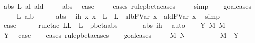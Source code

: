 \begin{isabellebody}
\isanewline
{}\isamarkupfalse%
\ {\isacharparenleft}abs\ L\ al\ ald{\isacharparenright}\ \isanewline
\ \ \isamarkupfalse%
\ abs{\isacharparenleft}{}{\isacharparenright}\ \isamarkupfalse%
\ {\isacharquery}case\ \isanewline
\ \ \isamarkupfalse%
\ {\isacharparenleft}cases\ rule{\isacharcolon}pbeta{\isachardot}cases{\isacharparenright}\ \isanewline
\ \ \isamarkupfalse%
\ simp\isanewline
\ \ \isamarkupfalse%
\ goal{\isacharunderscore}cases\isanewline
\ \ \isamarkupfalse%
\ {\isacharparenleft}{}\ L{\isacharprime}\ alb{\isacharparenright}\isanewline
\ \ \ \ \isamarkupfalse%
\ abs\ \isamarkupfalse%
\ ih{\isacharcolon}\ {\isachardoublequoteopen}{\isasymAnd}x{\isachardot}\ x\ {\isasymnotin}\ L\ {\isasymunion}\ L{\isacharprime}\ {\isasymLongrightarrow}\ alb{\isacharcircum}FVar\ x\ {\isasymggreater}\ ald{\isacharcircum}FVar\ x{\isachardoublequoteclose}\ \isamarkupfalse%
\ simp\isanewline
\ \ \ \ \isamarkupfalse%
\ {\isacharquery}case\isanewline
\ \ \ \ \isamarkupfalse%
\ {\isacharparenleft}rule{\isacharunderscore}tac\ L{\isacharequal}{\isachardoublequoteopen}L\ {\isasymunion}\ L{\isacharprime}{\isachardoublequoteclose}\ \ pbeta{\isachardot}abs{\isacharparenright}\isanewline
\ \ \ \ \isamarkupfalse%
\ {}\ abs\ ih\ \isamarkupfalse%
\ auto\isanewline
\ \ \isamarkupfalse%
\isanewline
{}\isamarkupfalse%
\isanewline
{}\isamarkupfalse%
\ {\isacharparenleft}Y\ M\ M{\isacharprime}\ {\isasymsigma}{\isacharparenright}\ \isanewline
\ \ \isamarkupfalse%
\ Y{\isacharparenleft}{}{\isacharparenright}\ \isamarkupfalse%
\ {\isacharquery}case\isanewline
\ \ \isamarkupfalse%
\ {\isacharparenleft}cases\ rule{\isacharcolon}pbeta{\isachardot}cases{\isacharparenright}\isanewline
\ \ \isamarkupfalse%
\ goal{\isacharunderscore}cases\isanewline
\ \ \isamarkupfalse%
\ {\isacharparenleft}{}\ M{\isacharprime}{\isacharprime}\ N{\isacharprime}{\isacharprime}{\isacharparenright}\isanewline
\ \ \ \ \isamarkupfalse%
\ {}{\isacharparenleft}{}{\isacharparenright}\ \isamarkupfalse%
\ {}{\isacharcolon}\ {\isachardoublequoteopen}M{\isacharprime}{\isacharprime}\ {\isacharequal}\ Y\ {\isasymsigma}{\isachardoublequoteclose}\ \isamarkupfalse%

\end{isabellebody}
